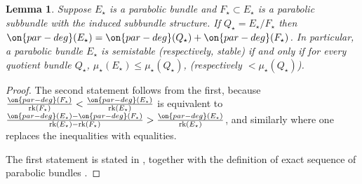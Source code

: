 \documentclass[12 pt]{amsart}
\theoremstyle{plain}
\newtheorem{lemma}[subsubsection]{Lemma}
\theoremstyle{definition}
\theoremstyle{remark}
\numberwithin{equation}{section}
\DeclareMathOperator\rk{rk}
\begin{document}
\begin{lemma}
	\label{lemma:quotient-semistable}
	Suppose $E_\star$ is a parabolic bundle and $F_\star \subset E_\star$ is
	a parabolic subbundle with the induced subbundle structure. If $Q_\star
	= E_\star/F_\star$ then $\on{par-deg}(E_\star) = \on{par-deg}(Q_\star) +
	\on{par-deg}(F_\star)$.
	In particular, a parabolic bundle $E_\star$ is semistable (respectively,
	stable) if and only if for every quotient
	bundle $Q_\star$, $\mu_\star(E_\star) \leq \mu_\star(Q_\star)$, (respectively $<
	\mu_\star(Q_\star)$).
\end{lemma}
\begin{proof}
	The second statement follows from the first, because
	$\frac{\on{par-deg}(F_\star)}{\rk(F_\star)} <
	\frac{\on{par-deg}(E_\star)}{\rk(E_\star)}$
	is equivalent to 
	$\frac{\on{par-deg}(E_\star)- \on{par-deg}(F_\star)}{\rk(E_\star) -
	\rk(F_\star)} >
	\frac{\on{par-deg}(E_\star)}{\rk(E_\star)}$, and similarly where one
	replaces the inequalities with equalities.

	The first statement is stated in
	\cite[Part 3, \S1.A, p. 69, Remark
	3]{seshadri:fibres-vectoriels-sur-les-courbes-algebriques},
	together with the definition of exact sequence of parabolic bundles
	\cite[Part 3, \S1.A, p. 68]{seshadri:fibres-vectoriels-sur-les-courbes-algebriques}.
% 
\end{proof}
\end{document}
